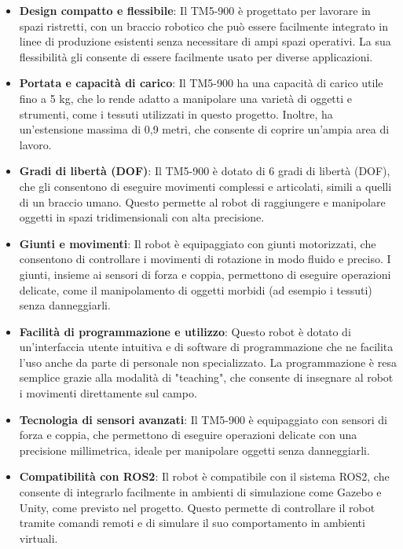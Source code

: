 \documentclass[11pt]{report}
\begin{document}
\begin{itemize}
    \item \textbf{Design compatto e flessibile}: Il TM5-900 è progettato per lavorare in spazi ristretti, con un braccio robotico che può essere facilmente integrato in linee di produzione esistenti senza necessitare di ampi spazi operativi. La sua flessibilità gli consente di essere facilmente usato per diverse applicazioni.
    \item \textbf{Portata e capacità di carico}: Il TM5-900 ha una capacità di carico utile fino a 5 kg, che lo rende adatto a manipolare una varietà di oggetti e strumenti, come i tessuti utilizzati in questo progetto. Inoltre, ha un'estensione massima di 0,9 metri, che consente di coprire un'ampia area di lavoro.
    \item \textbf{Gradi di libertà (DOF)}: Il TM5-900 è dotato di 6 gradi di libertà (DOF), che gli consentono di eseguire movimenti complessi e articolati, simili a quelli di un braccio umano. Questo permette al robot di raggiungere e manipolare oggetti in spazi tridimensionali con alta precisione.
    \item \textbf{Giunti e movimenti}: Il robot è equipaggiato con giunti motorizzati, che consentono di controllare i movimenti di rotazione in modo fluido e preciso. I giunti, insieme ai sensori di forza e coppia, permettono di eseguire operazioni delicate, come il manipolamento di oggetti morbidi (ad esempio i tessuti) senza danneggiarli.
    \item \textbf{Facilità di programmazione e utilizzo}: Questo robot è dotato di un'interfaccia utente intuitiva e di software di programmazione che ne facilita l'uso anche da parte di personale non specializzato. La programmazione è resa semplice grazie alla modalità di "teaching", che consente di insegnare al robot i movimenti direttamente sul campo.
    \item \textbf{Tecnologia di sensori avanzati}: Il TM5-900 è equipaggiato con sensori di forza e coppia, che permettono di eseguire operazioni delicate con una precisione millimetrica, ideale per manipolare oggetti senza danneggiarli.
    \item \textbf{Compatibilità con ROS2}: Il robot è compatibile con il sistema ROS2, che consente di integrarlo facilmente in ambienti di simulazione come Gazebo e Unity, come previsto nel progetto. Questo permette di controllare il robot tramite comandi remoti e di simulare il suo comportamento in ambienti virtuali.
\end{itemize}
\end{document}
